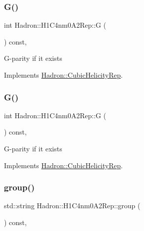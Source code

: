 \subsubsection{\texorpdfstring{G()}{G()}\hspace{0.1cm}{\footnotesize\ttfamily [1/2]}}
{\footnotesize\ttfamily int Hadron\+::\+H1\+C4nm0\+A2\+Rep\+::G (\begin{DoxyParamCaption}{ }\end{DoxyParamCaption}) const\hspace{0.3cm}{\ttfamily [inline]}, {\ttfamily [virtual]}}

G-\/parity if it exists 

Implements \mbox{\hyperlink{structHadron_1_1CubicHelicityRep_a50689f42be1e6170aa8cf6ad0597018b}{Hadron\+::\+Cubic\+Helicity\+Rep}}.

\mbox{\label{structHadron_1_1H1C4nm0A2Rep_a8f9793e51d261ad8dbb7c150b303737b}} 
\subsubsection{\texorpdfstring{G()}{G()}\hspace{0.1cm}{\footnotesize\ttfamily [2/2]}}
{\footnotesize\ttfamily int Hadron\+::\+H1\+C4nm0\+A2\+Rep\+::G (\begin{DoxyParamCaption}{ }\end{DoxyParamCaption}) const\hspace{0.3cm}{\ttfamily [inline]}, {\ttfamily [virtual]}}

G-\/parity if it exists 

Implements \mbox{\hyperlink{structHadron_1_1CubicHelicityRep_a50689f42be1e6170aa8cf6ad0597018b}{Hadron\+::\+Cubic\+Helicity\+Rep}}.

\mbox{\label{structHadron_1_1H1C4nm0A2Rep_a3033103082fad0b1572469c929fde9bb}} 
\subsubsection{\texorpdfstring{group()}{group()}\hspace{0.1cm}{\footnotesize\ttfamily [1/3]}}
{\footnotesize\ttfamily std\+::string Hadron\+::\+H1\+C4nm0\+A2\+Rep\+::group (\begin{DoxyParamCaption}{ }\end{DoxyParamCaption}) const\hspace{0.3cm}{\ttfamily [inline]}, {\ttfamily [virtual]}}

